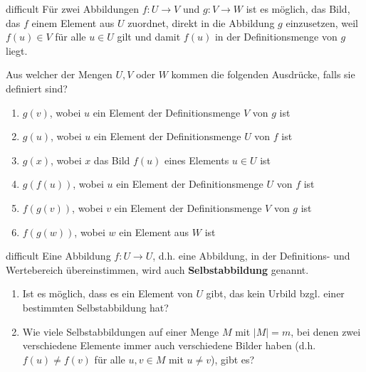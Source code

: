\documentclass[../abbildungen.tex]{subfiles}
\begin{document}
\begin{exercise}{difficult}
    Für zwei Abbildungen $f\colon U\rightarrow V$ und $g\colon V\rightarrow W$ ist es möglich, das Bild, das $f$ einem Element aus $U$ zuordnet, direkt in die Abbildung $g$ einzusetzen, weil $f(u)\in V$ für alle $u\in U$ gilt und damit $f(u)$ in der Definitionsmenge von $g$ liegt.
    
    Aus welcher der Mengen $U, V$ oder $W$ kommen die folgenden Ausdrücke, falls sie definiert sind?
        \begin{enumerate}
            \item $g(v)$, wobei $u$ ein Element der Definitionsmenge $V$ von $g$ ist
            \item $g(u)$, wobei $u$ ein Element der Definitionsmenge $U$ von $f$ ist
            \item $g(x)$, wobei $x$ das Bild $f(u)$ eines Elements $u\in U$ ist
            \item $g(f(u))$, wobei $u$ ein Element der Definitionsmenge $U$ von $f$ ist
            \item $f(g(v))$, wobei $v$ ein Element der Definitionsmenge $V$ von $g$ ist
            \item $f(g(w))$, wobei $w$ ein Element aus $W$ ist
        \end{enumerate}
\end{exercise}

\begin{exercise}{difficult}
    Eine Abbildung $f\colon U\rightarrow U$, d.h. eine Abbildung, in der Definitions- und Wertebereich übereinstimmen, wird auch \textbf{Selbstabbildung} genannt.
    
    \begin{enumerate}
        \item Ist es möglich, dass es ein Element von $U$ gibt, das kein Urbild bzgl. einer bestimmten Selbstabbildung hat? 
        \item Wie viele Selbstabbildungen auf einer Menge $M$ mit $|M|=m$, bei denen zwei verschiedene Elemente immer auch verschiedene Bilder haben (d.h. $f(u)\neq f(v)$ für alle $u,v\in M$ mit $u\neq v$), gibt es?
    \end{enumerate}
\end{exercise}
\end{document}
